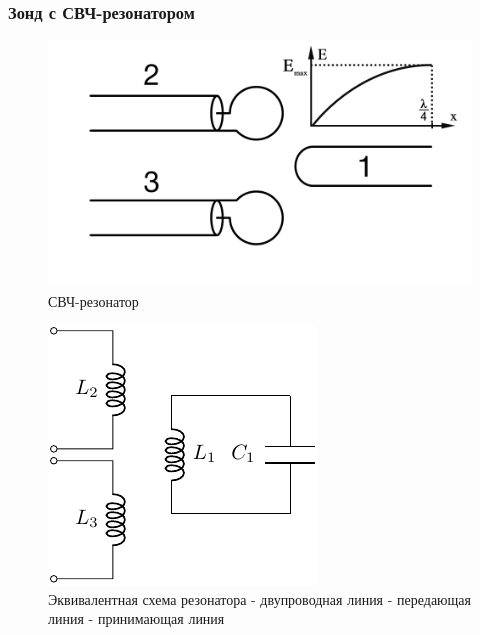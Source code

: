 \documentclass[10pt,pdf,hyperref={unicode}, dvipsnames]{beamer}
\begin{document}
\begin{frame}
	\frametitle{Зонд с СВЧ-резонатором}
	\begin{minipage}[]{0.49\textwidth}
		\begin{figure}[H]
				\centering
				\includegraphics[width=\linewidth]{fig/resonator}
				\caption*{СВЧ-резонатор}
				\label{fig:chem1}
		\end{figure}
	\end{minipage}
	\begin{minipage}[]{0.49\textwidth}
		\begin{figure}[H]
				\centering
				\includegraphics[width=\linewidth]{chem/chem1}
				\caption*{Эквивалентная схема резонатора
				- двупроводная линия 
				- передающая линия 
				- принимающая линия}
				\label{fig:chem1}
		\end{figure}
	\end{minipage}


\end{frame}
\end{document}
